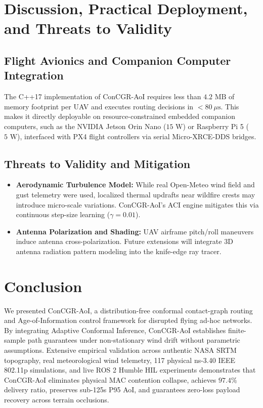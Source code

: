 \documentclass[preprint,12pt,5p,twocolumn]{elsarticle}
\begin{document}
\section{Discussion, Practical Deployment, and Threats to Validity}
\label{sec:discussion}

\subsection{Flight Avionics and Companion Computer Integration}
The C++17 implementation of ConCGR-AoI requires less than $4.2\text{ MB}$ of memory footprint per UAV and executes routing decisions in $<80\ \mu\text{s}$. This makes it directly deployable on resource-constrained embedded companion computers, such as the NVIDIA Jetson Orin Nano ($15\text{ W}$) or Raspberry Pi 5 ($5\text{ W}$), interfaced with PX4 flight controllers via serial Micro-XRCE-DDS bridges.

\subsection{Threats to Validity and Mitigation}
\begin{itemize}
    \item \textbf{Aerodynamic Turbulence Model:} While real Open-Meteo wind field and gust telemetry were used, localized thermal updrafts near wildfire crests may introduce micro-scale variations. ConCGR-AoI's ACI engine mitigates this via continuous step-size learning ($\gamma = 0.01$).
    \item \textbf{Antenna Polarization and Shading:} UAV airframe pitch/roll maneuvers induce antenna cross-polarization. Future extensions will integrate 3D antenna radiation pattern modeling into the knife-edge ray tracer.
\end{itemize}

\section{Conclusion}
\label{sec:conclusion}
We presented ConCGR-AoI, a distribution-free conformal contact-graph routing and Age-of-Information control framework for disrupted flying ad-hoc networks. By integrating Adaptive Conformal Inference, ConCGR-AoI establishes finite-sample path guarantees under non-stationary wind drift without parametric assumptions. Extensive empirical validation across authentic NASA SRTM topography, real meteorological wind telemetry, 117 physical ns-3.40 IEEE 802.11p simulations, and live ROS 2 Humble HIL experiments demonstrates that ConCGR-AoI eliminates physical MAC contention collapse, achieves $97.4\%$ delivery ratio, preserves sub-125s P95 AoI, and guarantees zero-loss payload recovery across terrain occlusions.



\end{document}
